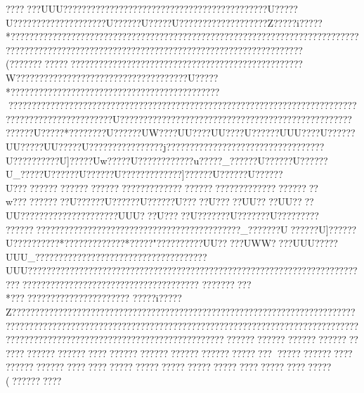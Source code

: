{{{{{{{{{{{{{{{{{{{{{{{{{{{{{{{{{{{{{{{{{{{{{{{{{{{{{{{{{{{{{{{{{{{{{{{{{{{{{{{{{{{{{{{{{{{{{{{{{{{{{{{{{{{{{{{{{{{{{{{{{{{{{{{{{{{{{{{{{{{{{{{{{{{{{{{{{{{{{{{{{{{{{{{{{{{{{{{{{{{{{{{{{{{{{{{{{{{{{{{{{{{{{{{{{{{{{{{{{{{{{{{{{{{{{{{{{{{{{{{{{{{{{{{{{{{{{{{{{{{{{{{{{{{{{{{{{{{{{{{{{{{{{{{{{{{{{{{{{{{{{{{{{{{{{{{{{{{{{{{{{{{{{{{{{{{{{{{{{{{{{{{{{{{{{{{{{{{{{{{{{{{{{{{{{{{{{{{{{{{{{{{{{{{{{{{{{{{{{{{{{{{{{{{{{{{{{{{{{{{{{{{{{{{{{{{{{{{{{{{{{{{{{{{{{{{{{{{{{{{{{{{{{{{{{{{{{{{{{{{{{{{{{{{{{{{{{{{{{{{{{{{{{{{{{{{{{{{{{{{{{{{{{{{{{{{{{{{{{{{{{{{{{{{{{{{{{{{{{{{{{{{{{{{{{{{{{{{{{{{{{{{{{{{{{{{{{{{{{{{{{{{{{{{{{{{{{{{{{{{{{{{{{{{{{{{{{{{{{{{{{{{{{{{{{{{{{{{{{{{{{{{{{{{{{{{{{{{{{{{{{{{{{{{{{{{{{{{{{{{{{{{{{{{{{{{{{{{{{{{{{{{{{{{{{{{{{{{{{{{{{{{{{{{{{{{{{{{{{{{{{{{{{{{{{{{{{{{{{{{{{{{{{{{{{{{{{{{{{{{{{{{{{{{{{{{{{{{{{{{{{{{{{{{{{{{{{{{{{{{{{{{{{{{{{{{{{{{{{{{{{{{{{{{{{{{{{{{{{{{{{{{{{{{{{{{{{{{{{{{{{{{{{{{{{{{{{{{{{{{{{{{{{{{{{{{{{{{{{{{{{{{{{{{{{{{{{{{{{{{{{{{{{{{{{{{{{{{{{{{{{{{{{{{{{{{{{{{{{{{{{{{{{{{{{{{{{{{{{{{{{{{{{{{{{{{{{{{{{{{{{{{{{{{{{{{{{{{{{{{{{{{{{{{{{{{{{{{{{{{{{{{{{{{{{{{{{{{{{{{{{{{{{{{{{{{{{{{{{{{{{{{{{{{{{{{{{{{{{{{{{{{{{{{{{{{{{{{{{{{{{{{{{{{{{{{{{{{{{{{{{{{{{{{{{{{{{{{{{{{{{{{{{{{{{{{{{{{{{{{{{{{{{{{{{{{{{{{{{{{{{{{{{{{{{{{{{{{{{{{{{{{{{{{{{{{{{{{{{{{{{{{{{{{{{{{{{{{{{{{{{{{{{{ ????  ???UUU????????  ?????  ???????????? ?????? ?????????????U?????U????????????????????U??????U?????U???????????????????Z?????i?????*????? ??????????????????????????????????????????????????????????????????????????????????????????????????????????????????????????????????????( ???????????? ???????????????????????????????????????? ??????????W??????????????????????????????? ??????U?????* ???????????????????????????????????????????????????????????????????????????????????????????????????????????????????????????????????????????????U??????????????????????????????????????????????????
??????U?????* ?????  ???U??????UW????UU????UU????U??????UUU????U??????UU?????UU?????U????????????????j??????????????????????????????????U??????????U]?????Uw?????U????????????u?????_??????U??????U??????U_?????U??????U??????U?????????????]??????U??????U??????U?????????????????????????????????????????????????????????????w???????????U??????U??????U??????U?????U?????UU????UU????UU???????  ?????  ?????  ????UUU???U?????U???????U???????U?????????
???????????? ?????? ????????????? ???????????????????_???????U??????U]??????U??????????*??????? ??????* ?????" ?????? ????UU?????UWW????UUU?????UUU_????    ????   ????   ????   ????   ????   ????   ?????  ????UUU?????  ?????? ?????? ????????????????????????????????????????????????????????????????????????????????? ??????? ???????
??????????*  ???  ????????????  ?????  ?????  ?????i?????Z???????????????????????????????????????????????????????????????????????????????????????????????????????????????????????????????????????????????????????????????????????????????????????????????????????????????????????????????????????????????????????????????????????????????? ???????? ?????? ???? ?????? ?????? ????  ????  ?????  ?????  ?????  ?????  ?????  ????  ?????  ????  ?????( ?????? ???? }}}}}}}}}}}}}}}}}}}}}}}}}}}}}}}}}}}}}}}}}}}}}}}}}}}}}}}}}}}}}}}}}}}}}}}}}}}}}}}}}}}}}}}}}}}}}}}}}}}}}}}}}}}}}}}}}}}}}}}}}}}}}}}}}}}}}}}}}}}}}}}}}}}}}}}}}}}}}}}}}}}}}}}}}}}}}}}}}}}}}}}}}}}}}}}}}}}}}}}}}}}}}}}}}}}}}}}}}}}}}}}}}}}}}}}}}}}}}}}}}}}}}}}}}}}}}}}}}}}}}}}}}}}}}}}}}}}}}}}}}}}}}}}}}}}}}}}}}}}}}}}}}}}}}}}}}}}}}}}}}}}}}}}}}}}}}}}}}}}}}}}}}}}}}}}}}}}}}}}}}}}}}}}}}}}}}}}}}}}}}}}}}}}}}}}}}}}}}}}}}}}}}}}}}}}}}}}}}}}}}}}}}}}}}}}}}}}}}}}}}}}}}}}}}}}}}}}}}}}}}}}}}}}}}}}}}}}}}}}}}}}}}}}}}}}}}}}}}}}}}}}}}}}}}}}}}}}}}}}}}}}}}}}}}}}}}}}}}}}}}}}}}}}}}}}}}}}}}}}}}}}}}}}}}}}}}}}}}}}}}}}}}}}}}}}}}}}}}}}}}}}}}}}}}}}}}}}}}}}}}}}}}}}}}}}}}}}}}}}}}}}}}}}}}}}}}}}}}}}}}}}}}}}}}}}}}}}}}}}}}}}}}}}}}}}}}}}}}}}}}}}}}}}}}}}}}}}}}}}}}}}}}}}}}}}}}}}}}}}}}}}}}}}}}}}}}}}}}}}}}}}}}}}}}}}}}}}}}}}}}}}}}}}}}}}}}}}}}}}}}}}}}}}}}}}}}}}}}}}}}}}}}}}}}}}}}}}}}}}}}}}}}}}}}}}}}}}}}}}}}}}}}}}}}}}}}}}}}}}}}}}}}}}}}}}}}}}}}}}}}}}}}}}}}}}}}}}}}}}}}}}}}}}}}}}}}}}}}}}}}}}}}}}}}}}}}}}}}}}}}}}}}}}}}}}}}}}}}}}}}}}}}}}}}}}}}}}}}}}}}}}}}}}}}}}}}}}}}}}}}}}}}}}}}}}}}}}}}}}}}}}}}}}}}}}}}}}}}}}}}}}}}}}}}}}}}}}}}}}}}}}}}}}}}}}}}}}}}}}}}}}}}}}}}}}}}}}}}}}}}}}}}}}}}}}}}}}}}}}}}}}}}}}}}}}}}}}}}}}}}}}}}}}}}}}}}}}}}}}}}}}}}}}}}}}}}}}}}}}}}}}}}}}}}}}}}}}}}}}}}}}}}}}}}}}}}}}}}}}}}}}}}}}}}}}}}}}}}}}}}}}}}}}}}}}}}}}}}}}}}}}}}}}}}}}}}}}}}}}}}}}}}}
